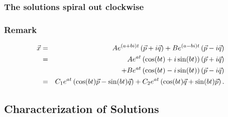 \begin{frame}
  \frametitle{The solutions spiral out clockwise}

\end{frame}

\begin{frame}
  \frametitle{Remark}

  \begin{eqnarray*}
    \vec{x} & = & Ae^{(a+bi)t} \left( \vec{p} + i \vec{q} \right) 
             + Be^{(a-bi)t}\left( \vec{p} - i \vec{q} \right) \\
    & = & Ae^{at} \left( \cos(bt) + i \sin(bt) \right) \left( \vec{p} + i \vec{q} \right) \\
    & & + Be^{at}\left( \cos(bt) - i \sin(bt) \right) \left( \vec{p} - i \vec{q} \right) \\
  & = & C_1 e^{at} \left( \cos(bt) \vec{p} - \sin(bt) \vec{q} \right)
  + C_2 e^{at} \left( \cos(bt) \vec{q} + \sin(bt) \vec{p} \right).
  \end{eqnarray*}

\end{frame}



\subsection{Characterization of Solutions}

